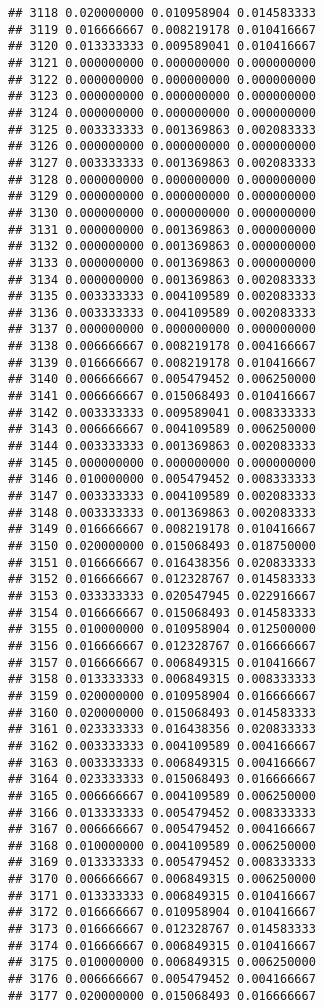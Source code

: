 \documentclass[
]{article}
\begin{document}
\begin{verbatim}
## 3118 0.020000000 0.010958904 0.014583333
## 3119 0.016666667 0.008219178 0.010416667
## 3120 0.013333333 0.009589041 0.010416667
## 3121 0.000000000 0.000000000 0.000000000
## 3122 0.000000000 0.000000000 0.000000000
## 3123 0.000000000 0.000000000 0.000000000
## 3124 0.000000000 0.000000000 0.000000000
## 3125 0.003333333 0.001369863 0.002083333
## 3126 0.000000000 0.000000000 0.000000000
## 3127 0.003333333 0.001369863 0.002083333
## 3128 0.000000000 0.000000000 0.000000000
## 3129 0.000000000 0.000000000 0.000000000
## 3130 0.000000000 0.000000000 0.000000000
## 3131 0.000000000 0.001369863 0.000000000
## 3132 0.000000000 0.001369863 0.000000000
## 3133 0.000000000 0.001369863 0.000000000
## 3134 0.000000000 0.001369863 0.002083333
## 3135 0.003333333 0.004109589 0.002083333
## 3136 0.003333333 0.004109589 0.002083333
## 3137 0.000000000 0.000000000 0.000000000
## 3138 0.006666667 0.008219178 0.004166667
## 3139 0.016666667 0.008219178 0.010416667
## 3140 0.006666667 0.005479452 0.006250000
## 3141 0.006666667 0.015068493 0.010416667
## 3142 0.003333333 0.009589041 0.008333333
## 3143 0.006666667 0.004109589 0.006250000
## 3144 0.003333333 0.001369863 0.002083333
## 3145 0.000000000 0.000000000 0.000000000
## 3146 0.010000000 0.005479452 0.008333333
## 3147 0.003333333 0.004109589 0.002083333
## 3148 0.003333333 0.001369863 0.002083333
## 3149 0.016666667 0.008219178 0.010416667
## 3150 0.020000000 0.015068493 0.018750000
## 3151 0.016666667 0.016438356 0.020833333
## 3152 0.016666667 0.012328767 0.014583333
## 3153 0.033333333 0.020547945 0.022916667
## 3154 0.016666667 0.015068493 0.014583333
## 3155 0.010000000 0.010958904 0.012500000
## 3156 0.016666667 0.012328767 0.016666667
## 3157 0.016666667 0.006849315 0.010416667
## 3158 0.013333333 0.006849315 0.008333333
## 3159 0.020000000 0.010958904 0.016666667
## 3160 0.020000000 0.015068493 0.014583333
## 3161 0.023333333 0.016438356 0.020833333
## 3162 0.003333333 0.004109589 0.004166667
## 3163 0.003333333 0.006849315 0.004166667
## 3164 0.023333333 0.015068493 0.016666667
## 3165 0.006666667 0.004109589 0.006250000
## 3166 0.013333333 0.005479452 0.008333333
## 3167 0.006666667 0.005479452 0.004166667
## 3168 0.010000000 0.004109589 0.006250000
## 3169 0.013333333 0.005479452 0.008333333
## 3170 0.006666667 0.006849315 0.006250000
## 3171 0.013333333 0.006849315 0.010416667
## 3172 0.016666667 0.010958904 0.010416667
## 3173 0.016666667 0.012328767 0.014583333
## 3174 0.016666667 0.006849315 0.010416667
## 3175 0.010000000 0.006849315 0.006250000
## 3176 0.006666667 0.005479452 0.004166667
## 3177 0.020000000 0.015068493 0.016666667

\end{verbatim}
\end{document}
